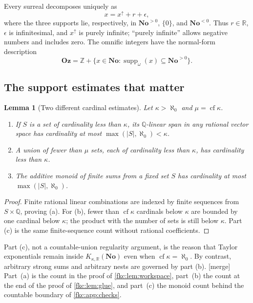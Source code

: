 \documentclass[11pt,letterpaper]{article}
\numberwithin{equation}{section}
\newtheorem{lemma}[theorem]{Lemma}
\theoremstyle{definition}
\theoremstyle{remark}
\newcommand{\R}{\mathbb R}
\newcommand{\Q}{\mathbb Q}
\newcommand{\No}{\mathbf{No}}
\newcommand{\cf}{\operatorname{cf}}
\newcommand{\mergetag}{\textup{\textsf{\small[merge]}}}%
\newcommand{\Z}{\mathbb Z}
\newcommand{\Oz}{\mathbf{Oz}}
\newcommand{\suppw}{\operatorname{supp}_{\omega}}
\newcommand{\card}[1]{\lvert #1\rvert}
\newcommand{\KN}[2]{K_{#1,#2}(\No)}%
\begin{document}
Every surreal decomposes uniquely as
\begin{equation}\label{fkc:sb:eq:split}
 x=x^\uparrow+r+\epsilon,
\end{equation}
where the three supports lie, respectively, in $\No^{>0}$, $\{0\}$, and $\No^{<0}$. Thus $r\in\R$, $\epsilon$ is infinitesimal, and $x^\uparrow$ is purely infinite; ``purely infinite'' allows negative numbers and includes zero. The omnific integers have the normal-form description
\begin{equation}\label{fkc:sb:eq:oz}
 \Oz=\Z+\{x\in\No:\suppw(x)\subseteq\No^{>0}\}.
\end{equation}

\subsection{The support estimates that matter}
\begin{lemma}[Two different cardinal estimates]\label{fkc:sb:lem:card}
Let $\kappa>\aleph_0$ and $\mu=\cf\kappa$.
\begin{enumerate}[label=\textup{(\alph*)}]
\item If $S$ is a set of cardinality less than $\kappa$, its $\Q$-linear span in any rational vector space has cardinality at most $\max(\card S,\aleph_0)<\kappa$.
\item A union of fewer than $\mu$ sets, each of cardinality less than $\kappa$, has cardinality less than $\kappa$.
\item The additive monoid of finite sums from a fixed set $S$ has cardinality at most $\max(\card S,\aleph_0)$.
\end{enumerate}
\end{lemma}
\begin{proof}
Finite rational linear combinations are indexed by finite sequences from $S\times\Q$, proving (a). For (b), fewer than $\cf\kappa$ cardinals below $\kappa$ are bounded by one cardinal below $\kappa$; the product with the number of sets is still below $\kappa$. Part (c) is the same finite-sequence count without rational coefficients.
\end{proof}

Part (c), not a countable-union regularity argument, is the reason that Taylor exponentials remain inside $\KN\kappa\R$ even when $\cf\kappa=\aleph_0$. By contrast, arbitrary strong sums and arbitrary nests are governed by part (b). \mergetag{} Part~(a) is the count in the proof of \cref{fkc:lem:workspace}, part~(b) the count at the end of the proof of \cref{fkc:lem:glue}, and part~(c) the monoid count behind the countable boundary of \cref{fkc:app:checks}.
\end{document}
